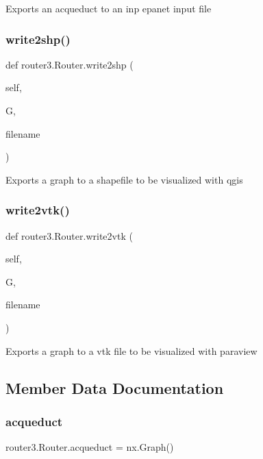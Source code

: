 \begin{DoxyVerb}Exports an acqueduct to an inp epanet input file
\end{DoxyVerb}
 \mbox{\label{classrouter3_1_1_router_a82eb0c81dc0177dec690e5112de0589a}} 
\subsubsection{write2shp()}
{\footnotesize\ttfamily def router3.\+Router.\+write2shp (\begin{DoxyParamCaption}\item[{}]{self,  }\item[{}]{G,  }\item[{}]{filename }\end{DoxyParamCaption})}

\begin{DoxyVerb}    Exports a graph to a shapefile to be visualized with qgis
\end{DoxyVerb}
 \mbox{\label{classrouter3_1_1_router_ae9da9d0c9d9650c2855aedd37d42ecb7}} 
\subsubsection{write2vtk()}
{\footnotesize\ttfamily def router3.\+Router.\+write2vtk (\begin{DoxyParamCaption}\item[{}]{self,  }\item[{}]{G,  }\item[{}]{filename }\end{DoxyParamCaption})}

\begin{DoxyVerb}Exports a graph to a vtk file to be visualized with paraview
\end{DoxyVerb}
 

\subsection{Member Data Documentation}
\mbox{\label{classrouter3_1_1_router_a57f18d229834552c3168a893ca5b41be}} 
\subsubsection{acqueduct}
{\footnotesize\ttfamily router3.\+Router.\+acqueduct = nx.\+Graph()\hspace{0.3cm}{\ttfamily [static]}}

